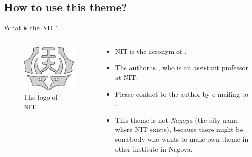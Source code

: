 \documentclass[10pt,dvipdfmx,m,compress]{beamer}
\begin{document}
  \subsection{How to use this theme?}
  \begin{frame}{What is the NIT?}
   \begin{columns}
    \begin{column}{.4\textwidth}
     \begin{figure}[h]
      \begin{center}
       \includegraphics[keepaspectratio,width=.8\textwidth]{NIT_logo.eps}
       \caption{The logo of NIT.}
      \end{center}
     \end{figure}
    \end{column}
    \begin{column}{.6\textwidth}
     \begin{itemize}
      \item NIT is the acronym of .
      \item The author is , who is an assistant professor at NIT.
      \item Please contact to the author by e-mailing to .
            \vspace{1zw}
      \item This theme is not {\itshape Nagoya} (the city name where NIT exists),
            because there might be somebody who wants to make own theme in other institute in Nagoya.
     \end{itemize}
    \end{column}
   \end{columns}
  \end{frame}
\end{document}
